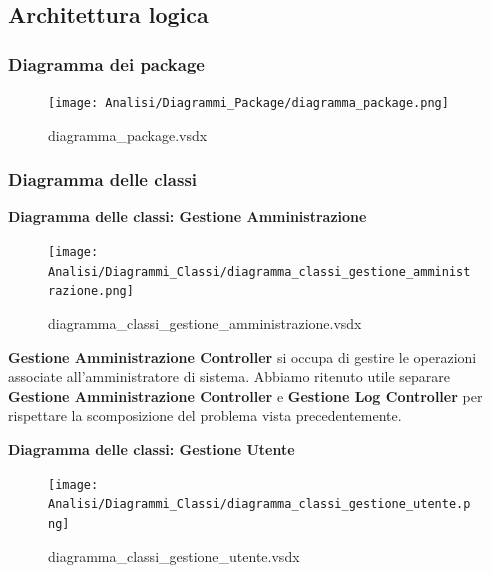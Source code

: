 \documentclass[a4paper]{article}
\begin{document}
\newpage

\subsection{Architettura logica}

\subsubsection{Diagramma dei package}


\begin{figure}[H]
    \texttt{[image: Analisi/Diagrammi\_Package/diagramma\_package.png]}
    \centering
    \caption{diagramma\_package.vsdx}
\end{figure}

\newpage

\subsubsection{Diagramma delle classi}

\textbf{Diagramma delle classi: Gestione Amministrazione}

\begin{figure}[H]
    \texttt{[image: Analisi/Diagrammi\_Classi/diagramma\_classi\_gestione\_amministrazione.png]}
    \centering
    \caption{diagramma\_classi\_gestione\_amministrazione.vsdx}
\end{figure}

\textbf{Gestione Amministrazione Controller} si occupa di gestire le operazioni associate all'amministratore di sistema. Abbiamo ritenuto utile separare \textbf{Gestione Amministrazione Controller} e \textbf{Gestione Log Controller} per rispettare la scomposizione del problema vista precedentemente.

\newpage

\textbf{Diagramma delle classi: Gestione Utente}


\begin{figure}[H]
    \texttt{[image: Analisi/Diagrammi\_Classi/diagramma\_classi\_gestione\_utente.png]}
    \centering
    \caption{diagramma\_classi\_gestione\_utente.vsdx}
\end{figure}
\end{document}
